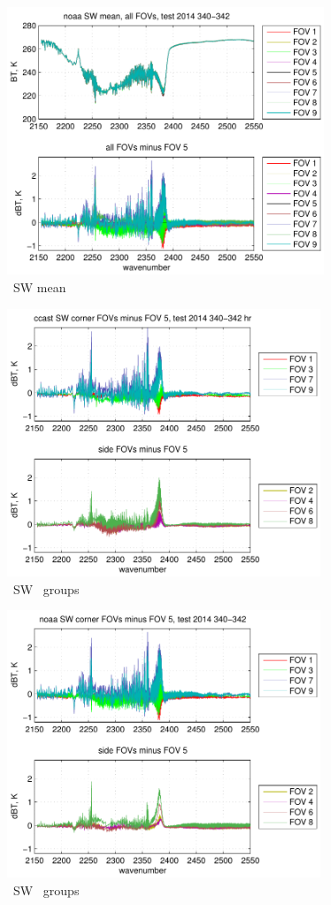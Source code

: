 \documentclass[12pt]{article}
\begin{document}
\begin{figure}
  \centering
  \includegraphics[height=8cm]{figures/noaa_SW_avg_2014_340-342.pdf}
  \caption{\noaa\ SW mean}
\end{figure}



\begin{figure}
  \centering
  \includegraphics[height=8cm]{figures/ccast_SW_dif_2014_340-342_hr.pdf}
  \caption{\ccast\ SW \fov\ groups}
\end{figure}


\begin{figure}
  \centering
  \includegraphics[height=8cm]{figures/noaa_SW_dif_2014_340-342.pdf}
  \caption{\noaa\ SW \fov\ groups}
\end{figure}

\end{document}
